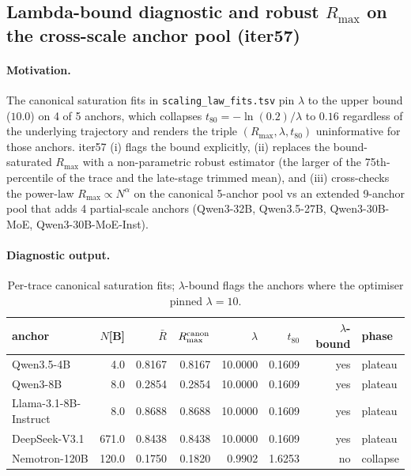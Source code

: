 \subsection{Lambda-bound diagnostic and robust $R_{\max}$ on the cross-scale anchor pool (iter57)}
\label{sec:scaling-law-iter57}
\paragraph{Motivation.}
The canonical saturation fits in \texttt{scaling\_law\_fits.tsv} pin $\lambda$ to the upper bound ($10.0$) on 4 of 5 anchors, which collapses $t_{80}=-\ln(0.2)/\lambda$ to $0.16$ regardless of the underlying trajectory and renders the triple $(R_{\max},\lambda,t_{80})$ uninformative for those anchors. iter57 (i) flags the bound explicitly, (ii) replaces the bound-saturated $R_{\max}$ with a non-parametric robust estimator (the larger of the 75th-percentile of the trace and the late-stage trimmed mean), and (iii) cross-checks the power-law $R_{\max}\propto N^{\alpha}$ on the canonical 5-anchor pool vs an extended 9-anchor pool that adds 4 partial-scale anchors (Qwen3-32B, Qwen3.5-27B, Qwen3-30B-MoE, Qwen3-30B-MoE-Inst).

\paragraph{Diagnostic output.}
\begin{table}[ht]
\centering\small
\begin{tabular}{lrrrrrrl}
\toprule
anchor & $N$[B] & $\bar R$ & $R_{\max}^{\rm canon}$ & $\lambda$ & $t_{80}$ & $\lambda$-bound & phase \\
\midrule
Qwen3.5-4B & 4.0 & 0.8167 & 0.8167 & 10.0000 & 0.1609 & yes & plateau \\
Qwen3-8B & 8.0 & 0.2854 & 0.2854 & 10.0000 & 0.1609 & yes & plateau \\
Llama-3.1-8B-Instruct & 8.0 & 0.8688 & 0.8688 & 10.0000 & 0.1609 & yes & plateau \\
DeepSeek-V3.1 & 671.0 & 0.8438 & 0.8438 & 10.0000 & 0.1609 & yes & plateau \\
Nemotron-120B & 120.0 & 0.1750 & 0.1820 & 0.9902 & 1.6253 & no & collapse \\
\bottomrule
\end{tabular}
\caption{Per-trace canonical saturation fits; $\lambda$-bound flags the anchors where the optimiser pinned $\lambda=10$.}
\end{table}

